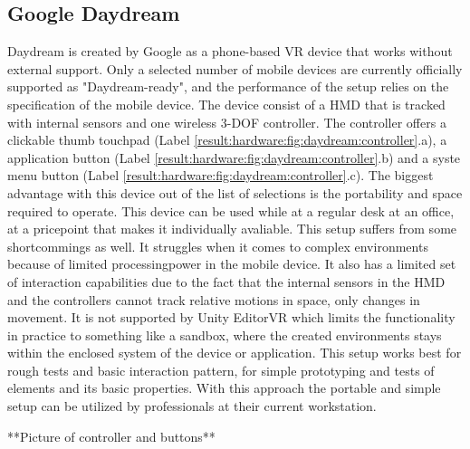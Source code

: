 \subsection{Google Daydream}
\label{result:hardware:daydream}
Daydream is created by Google as a phone-based VR device that works without external support. Only a selected number of mobile devices are currently officially supported as "Daydream-ready", and the performance of the setup relies on the specification of the mobile device. The device consist of a HMD that is tracked with internal sensors and one wireless 3-DOF controller. The controller offers a clickable thumb touchpad (Label \ref{result:hardware:fig:daydream:controller}.a), a application button (Label \ref{result:hardware:fig:daydream:controller}.b) and a syste menu button (Label \ref{result:hardware:fig:daydream:controller}.c). The biggest advantage with this device out of the list of selections is the portability and space required to operate. This device can be used while at a regular desk at an office, at a pricepoint that makes it individually avaliable. This setup suffers from some shortcommings as well. It struggles when it comes to complex environments because of limited processingpower in the mobile device. It also has a limited set of interaction capabilities due to the fact that the internal sensors in the HMD and the controllers cannot track relative motions in space, only changes in movement. It is not supported by Unity EditorVR which limits the functionality in practice to something like a sandbox, where the created environments stays within the enclosed system of the device or application.
This setup works best for rough tests and basic interaction pattern, for simple prototyping and tests of elements and its basic properties. With this approach the portable and simple setup can be utilized by professionals at their current workstation.

**Picture of controller and buttons**
